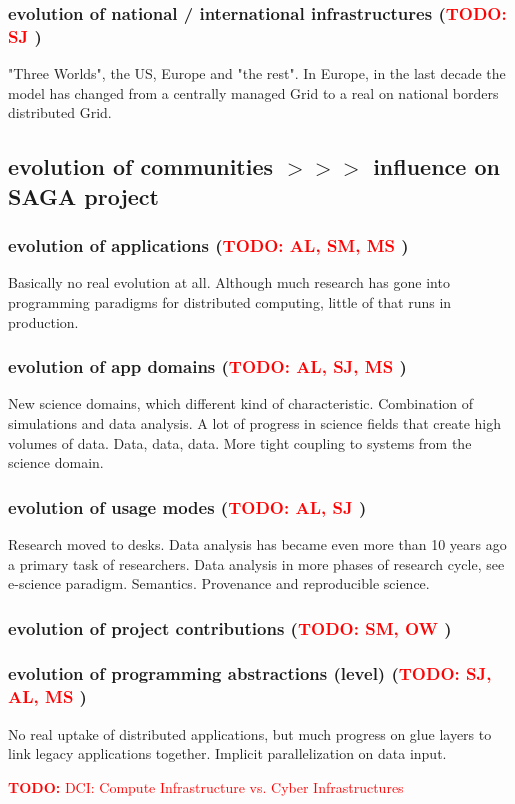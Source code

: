 \documentclass[]{article}
\newcommand{\B}[1]{\textbf{#1}}
\newcommand{\nind}{\noindent}
\newcommand{\todo}[1]{{\textcolor{red}{\B{TODO:} #1 }}}
\begin{document}
 \subsubsection{ evolution of national / international infrastructures (\todo{SJ})}

 "Three Worlds", the US, Europe and "the rest".  In Europe, in the
 last decade the model has changed from a centrally managed Grid to a
 real on national borders distributed Grid.\\

 
 \nind
 \subsection{ evolution of communities  $>>>$ influence on SAGA project}
 \subsubsection{ evolution of applications (\todo{AL, SM, MS})}
 
 Basically no real evolution at all. Although much research has gone
 into programming paradigms for distributed computing, little of that
 runs in production.
 
 \subsubsection{ evolution of app domains (\todo{AL, SJ, MS})}
 
 New science domains, which different kind of characteristic.
 Combination of simulations and data analysis. A lot of progress in
 science fields that create high volumes of data.  Data, data, data.
 More tight coupling to systems from the science domain.
 
 \subsubsection{ evolution of usage modes (\todo{AL, SJ})}
 
 Research moved to desks. Data analysis has became even more than 10
 years ago a primary task of researchers.  Data analysis in more
 phases of research cycle, see e-science paradigm.  Semantics.
 Provenance and reproducible science.
  
 \subsubsection{ evolution of project contributions (\todo{SM, OW})}
 
 \subsubsection{ evolution of programming abstractions (level) (\todo{SJ, AL, MS})}
 
 No real uptake of distributed applications, but much progress on glue
 layers to link legacy applications together.  Implicit
 parallelization on data input.


\newpage

\todo{DCI: Compute Infrastructure vs. Cyber Infrastructures}

\footnotesize


\end{document}
